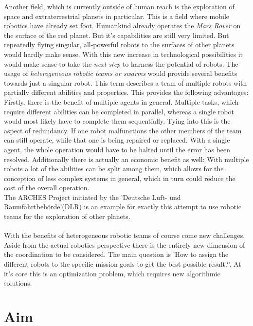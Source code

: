 Another field, which is currently outside of human reach is the exploration of space and extraterrestrial planets in particular. This is a field where mobile robotics have already set foot. Humankind already operates the \textit{Mars Rover} on the surface of the red planet. But it's capabilities are still very limited. But repeatedly flying singular, all-powerful robots to the surfaces of other planets would hardly make sense. With this new increase in technological possibilities it would make sense to take the \textit{next step} to harness the potential of robots. The usage of \textit{heterogeneous robotic teams or swarms} would provide several benefits towards just a singular robot. This term describes a team of multiple robots with partially different abilities and properties. This provides the following advantages: Firstly, there is the benefit of multiple agents in general. Multiple tasks, which require different abilities can be completed in parallel, whereas a single robot would most likely have to complete them sequentially. Tying into this is the aspect of redundancy. If one robot malfunctions the other members of the team can still operate, while that one is being repaired or replaced. With a single agent, the whole operation would have to be halted until the error has been resolved. Additionally there is actually an economic benefit as well: With multiple robots a lot of the abilities can be split among them, which allows for the conception of less complex systems in general, which in turn could reduce the cost of the overall operation.\\
The ARCHES Project initiated by the 'Deutsche Luft- und Raumfahrtbehörde'(DLR) is an example for exactly this attempt to use robotic teams for the exploration of other planets.\\ \\ %
With the benefits of heterogeneous robotic teams of course come new challenges. Aside from the actual robotics perspective there is the entirely new dimension of the coordination to be considered. The main question is 'How to assign the different robots to the specific mission goals to get the best possible result?'. At it's core this is an optimization problem, which requires new algorithmic solutions.

\section{Aim} \label{sec:aim}

